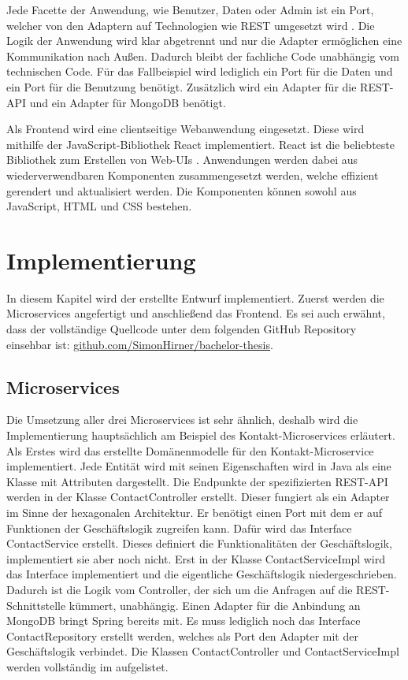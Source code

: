 Jede Facette der Anwendung, wie Benutzer, Daten oder Admin ist ein Port, welcher von den Adaptern auf Technologien wie \ac{REST} umgesetzt wird \parencite[vgl.][S. 204]{wolffMicroservices2018}. Die Logik der Anwendung wird klar abgetrennt und nur die Adapter ermöglichen eine Kommunikation nach Außen. Dadurch bleibt der fachliche Code unabhängig vom technischen Code. Für das Fallbeispiel wird lediglich ein Port für die Daten und ein Port für die Benutzung benötigt. Zusätzlich wird ein Adapter für die \ac{REST}-\ac{API} und ein Adapter für MongoDB benötigt.

Als Frontend wird eine clientseitige Webanwendung eingesetzt. Diese wird mithilfe der JavaScript-Bibliothek React implementiert. React ist die beliebteste Bibliothek zum Erstellen von Web-\acp{UI} \parencite[vgl.][]{stackoverflowMost2021}. Anwendungen werden dabei aus wiederverwendbaren Komponenten zusammengesetzt werden, welche effizient gerendert und aktualisiert werden. Die Komponenten können sowohl aus JavaScript, \ac{HTML} und \ac{CSS} bestehen. 

\clearpage
\section{Implementierung}
In diesem Kapitel wird der erstellte Entwurf implementiert. Zuerst werden die Microservices angefertigt und anschließend das Frontend. Es sei auch erwähnt, dass der vollständige Quellcode unter dem folgenden GitHub Repository einsehbar ist: \href{https://github.com/SimonHirner/bachelor-thesis}{github.com/SimonHirner/bachelor-thesis}.

\subsection{Microservices}
Die Umsetzung aller drei Microservices ist sehr ähnlich, deshalb wird die Implementierung hauptsächlich am Beispiel des Kontakt-Microservices erläutert. Als Erstes wird das erstellte Domänenmodelle für den Kontakt-Microservice implementiert. Jede Entität wird mit seinen Eigenschaften wird in Java als eine Klasse mit Attributen dargestellt. Die Endpunkte der spezifizierten \ac{REST}-\ac{API} werden in der Klasse ContactController erstellt. Dieser fungiert als ein Adapter im Sinne der hexagonalen Architektur. Er benötigt einen Port mit dem er auf Funktionen der Geschäftslogik zugreifen kann. Dafür wird das Interface ContactService erstellt. Dieses definiert die Funktionalitäten der Geschäftslogik, implementiert sie aber noch nicht. Erst in der Klasse ContactServiceImpl wird das Interface implementiert und die eigentliche Geschäftslogik niedergeschrieben. Dadurch ist die Logik vom Controller, der sich um die Anfragen auf die REST-Schnittstelle kümmert, unabhängig. Einen Adapter für die Anbindung an MongoDB bringt Spring bereits mit. Es muss lediglich noch das Interface ContactRepository erstellt werden, welches als Port den Adapter mit der Geschäftslogik verbindet. Die Klassen ContactController und ContactServiceImpl werden vollständig im  aufgelistet.

